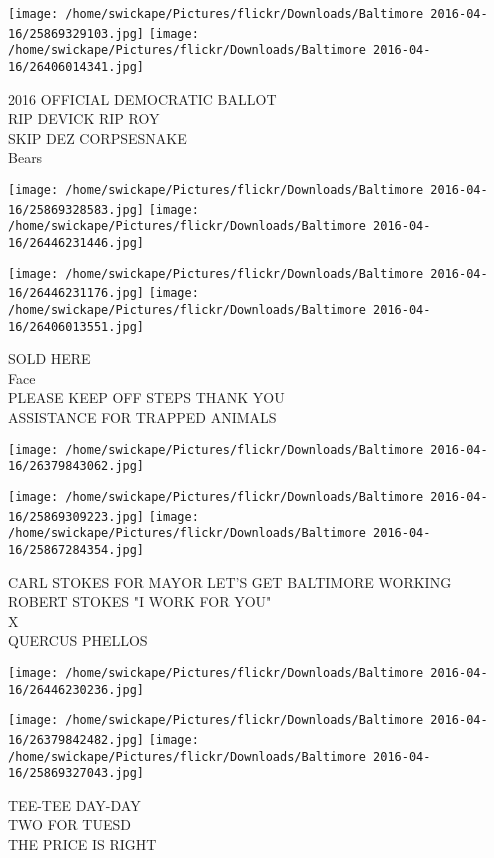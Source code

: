 \documentclass[10pt,letterpaper]{article}
\begin{document}
\texttt{[image: /home/swickape/Pictures/flickr/Downloads/Baltimore 2016-04-16/25869329103.jpg]}
\texttt{[image: /home/swickape/Pictures/flickr/Downloads/Baltimore 2016-04-16/26406014341.jpg]}

2016 OFFICIAL DEMOCRATIC BALLOT\\
RIP DEVICK RIP ROY\\
SKIP DEZ CORPSESNAKE\\
Bears
\pagebreak

\texttt{[image: /home/swickape/Pictures/flickr/Downloads/Baltimore 2016-04-16/25869328583.jpg]}
\texttt{[image: /home/swickape/Pictures/flickr/Downloads/Baltimore 2016-04-16/26446231446.jpg]}

\texttt{[image: /home/swickape/Pictures/flickr/Downloads/Baltimore 2016-04-16/26446231176.jpg]}
\texttt{[image: /home/swickape/Pictures/flickr/Downloads/Baltimore 2016-04-16/26406013551.jpg]}

SOLD HERE\\
Face\\
PLEASE KEEP OFF STEPS THANK YOU\\
ASSISTANCE FOR TRAPPED ANIMALS
\pagebreak

\texttt{[image: /home/swickape/Pictures/flickr/Downloads/Baltimore 2016-04-16/26379843062.jpg]}

\vspace{0.25in}
\texttt{[image: /home/swickape/Pictures/flickr/Downloads/Baltimore 2016-04-16/25869309223.jpg]}
\texttt{[image: /home/swickape/Pictures/flickr/Downloads/Baltimore 2016-04-16/25867284354.jpg]}

CARL STOKES FOR MAYOR LET'S GET BALTIMORE WORKING ROBERT STOKES "I WORK FOR YOU"\\
X\\
QUERCUS PHELLOS
\pagebreak

\texttt{[image: /home/swickape/Pictures/flickr/Downloads/Baltimore 2016-04-16/26446230236.jpg]}

\vspace{0.25in}
\texttt{[image: /home/swickape/Pictures/flickr/Downloads/Baltimore 2016-04-16/26379842482.jpg]}
\texttt{[image: /home/swickape/Pictures/flickr/Downloads/Baltimore 2016-04-16/25869327043.jpg]}

TEE{-}TEE DAY{-}DAY\\
TWO FOR TUESD\\
THE PRICE IS RIGHT
\pagebreak
\end{document}
